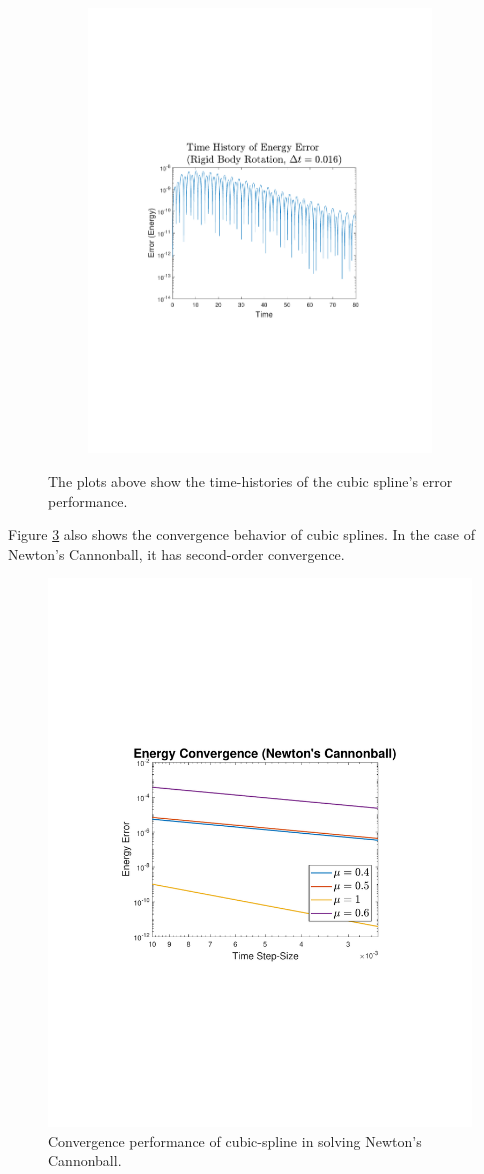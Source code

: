 \documentclass{article}
\begin{document}
\begin{figure}[H]
\begin{subfigure}{0.45\linewidth}
\includegraphics[trim={1.5in, 3in, 1.5in, 3in}, clip, width=0.95\linewidth]{eulerEnergyError}
\caption{}\label{fig:eulerEnergy}
\end{subfigure}
\caption{The plots above show the time-histories of the cubic spline's error performance.}
\end{figure} 
Figure \ref{fig:newtonConvergence} also shows the convergence behavior of cubic splines. In the case of Newton's Cannonball, it has second-order convergence.
\begin{figure}[H]
\centering
\includegraphics[trim={1.5in, 3in, 1.5in, 3in}, clip, width=0.45\linewidth]{newtonConvergence}
\caption{Convergence performance of cubic-spline in solving Newton's Cannonball.}\label{fig:newtonConvergence}
\end{figure}
\end{document}
